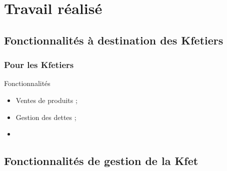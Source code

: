 \documentclass{polytech-presentation}
\newcommand{\beamerannot}[1]{
    \note{#1}
}
\begin{document}
        \section<presentation>{Travail réalisé}%

            \subsection<presentation>{Fonctionnalités à destination des Kfetiers}%
                \begin{frame}
		  \frametitle{Pour les Kfetiers}
                    \begin{block}{Fonctionnalités}
		      \begin{itemize}
		       \item Ventes de produits ;
		       \item Gestion des dettes ;
		       \item 
		      \end{itemize}
                    \end{block}
                    \beamerannot{}
                \end{frame}

            \subsection<presentation>{Fonctionnalités de gestion de la Kfet}%
                \begin{frame}
                    \begin{block}{}

                    \end{block}
                    \beamerannot{}
                \end{frame}%
\end{document}
